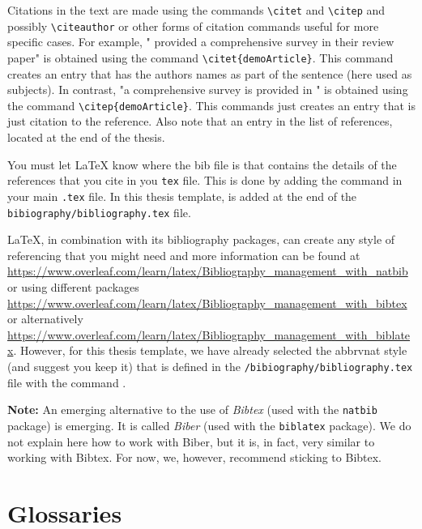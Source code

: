 Citations in the text are made using the commands \verb|\citet| and \verb|\citep| and possibly \verb|\citeauthor| or other forms of citation commands useful for more specific cases.
For example, "\citet{demoArticle} provided a comprehensive survey in their review paper" is obtained using the command \verb|\citet{demoArticle}|.
This command creates an entry that has the authors names as part of the sentence (here used as subjects). 
In contrast, "a comprehensive survey is provided in \citep{demoArticle}" is obtained using the command \verb|\citep{demoArticle}|. 
This commands just creates an entry that is just citation to the reference.
Also note that an entry in the list of references, located at the end of the thesis.

You must let \LaTeX{} know where the bib file is that contains the details of the references that you cite in you \verb|tex| file.
This is done by adding the command \verb|| in your main \verb|.tex| file.
In this thesis template, \verb|| is added at the end of the \verb|bibiography/bibliography.tex| file.

\LaTeX{}, in combination with its bibliography packages, can create any style of referencing that you might need and more information can be found at  \url{https://www.overleaf.com/learn/latex/Bibliography_management_with_natbib} or using different packages \url{https://www.overleaf.com/learn/latex/Bibliography_management_with_bibtex} or alternatively \url{https://www.overleaf.com/learn/latex/Bibliography_management_with_biblatex}.
However, for this thesis template, we have already selected the abbrvnat style (and suggest you keep it) that is defined in the \verb|/bibiography/bibliography.tex| file with the command \verb||.

\textbf{Note:} An emerging alternative to the use of \emph{Bibtex} (used with the \verb|natbib| package) is emerging.
It is called \emph{Biber} (used with the \verb|biblatex| package).
We do not explain here how to work with Biber, but it is, in fact, very similar to working with Bibtex. 
For now, we, however, recommend sticking to Bibtex.

\section{Glossaries}
\label{sec:Glossaries}

